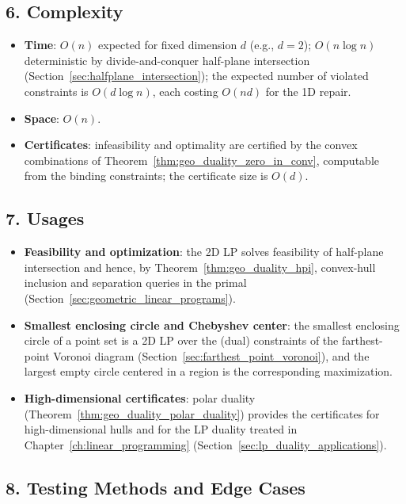 \subsection{6. Complexity}

\begin{itemize}
\item \textbf{Time}: $O(n)$ expected for fixed dimension $d$ (e.g., $d=2$);
  $O(n \log n)$ deterministic by divide-and-conquer half-plane intersection
  (Section~\ref{sec:halfplane_intersection}); the expected number of
  violated constraints is $O(d \log n)$, each costing $O(nd)$ for the 1D
  repair.
\item \textbf{Space}: $O(n)$.
\item \textbf{Certificates}: infeasibility and optimality are certified by
  the convex combinations of Theorem~\ref{thm:geo_duality_zero_in_conv},
  computable from the binding constraints; the certificate size is $O(d)$.
\end{itemize}

\subsection{7. Usages}

\begin{itemize}
\item \textbf{Feasibility and optimization}: the 2D LP solves feasibility
  of half-plane intersection and hence, by
  Theorem~\ref{thm:geo_duality_hpi}, convex-hull inclusion and separation
  queries in the primal (Section~\ref{sec:geometric_linear_programs}).
\item \textbf{Smallest enclosing circle and Chebyshev center}: the smallest
  enclosing circle of a point set is a 2D LP over the (dual) constraints
  of the farthest-point Voronoi diagram
  (Section~\ref{sec:farthest_point_voronoi}), and the largest empty circle
  centered in a region is the corresponding maximization.
\item \textbf{High-dimensional certificates}: polar duality
  (Theorem~\ref{thm:geo_duality_polar_duality}) provides the certificates
  for high-dimensional hulls and for the LP duality treated in
  Chapter~\ref{ch:linear_programming} (Section~\ref{sec:lp_duality_applications}).
\end{itemize}

\subsection{8. Testing Methods and Edge Cases}

